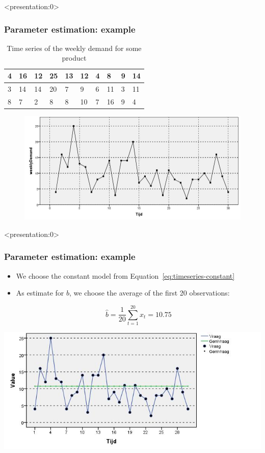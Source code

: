 \documentclass{beamer}
\begin{document}
\begin{frame}<presentation:0> %
  \frametitle{Parameter estimation: example}

  \begin{table}[t]
    \centering
    \begin{tabular}{|l|l|l|l|l|l|l|l|l|l|}
      \hline
      4 & 16 & 12 & 25 & 13 & 12 & 4 & 8  & 9 & 14 \\ \hline
      3 & 14 & 14 & 20 & 7  & 9  & 6 & 11 & 3 & 11 \\ \hline
      8 & 7  & 2  & 8  & 8  & 10 & 7 & 16 & 9 & 4  \\ \hline
    \end{tabular}
    \label{tab:data}
    \caption{Time series of the weekly demand for some product}
  \end{table}

  \begin{figure}
    \centering
    \includegraphics[width=.7\textwidth]{img/tijdreeks11}
  \end{figure}
\end{frame}

\begin{frame}<presentation:0> %
  \frametitle{Parameter estimation: example}

  \begin{itemize}
    \item We choose the constant model from Equation~\ref{eq:timeseries-constant}
    \item As estimate for $b$, we choose the average of the first 20 observations:

      \[ \widehat{b} = \frac{1}{20} \sum_{t = 1}^{20} x_{t}= 10.75 \]

  \end{itemize}

  \centering
  \includegraphics[width=.7\textwidth]{img/tijdreeks21.jpg}
\end{frame}
\end{document}
